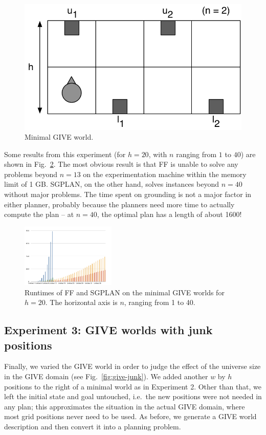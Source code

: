\begin{figure}
  \centering
  \includegraphics[width=0.4 \textwidth]{pic-buttons}
  \caption{Minimal GIVE world.}
  \label{fig:give-minimal}
\end{figure}

Some results from this experiment (for $h=20$, with $n$ ranging from
$1$ to $40$) are shown in Fig.~\ref{fig:give-runtime-minimal}.  The
most obvious result is that FF is unable to solve any problems beyond
$n=13$ on the experimentation machine within the memory limit of 1 GB.
SGPLAN, on the other hand, solves instances beyond $n=40$ without
major problems.  The time spent on grounding is not a major factor in
either planner, probably because the planners need more time to
actually compute the plan -- at $n=40$, the optimal plan has a length
of about 1600!

\begin{figure}
  \centering
  \includegraphics[width=0.4\textwidth]{pic-runtime-buttons}
  \caption{Runtimes of FF and SGPLAN on the minimal GIVE worlds for $h=20$. The horizontal axis is $n$, ranging from 1 to 40.}
  \label{fig:give-runtime-minimal}
\end{figure}

\subsection{Experiment 3: GIVE worlds with junk positions}
\label{sec:experiment-3:-give}

Finally, we varied the GIVE world in order to judge the effect of the
universe size in the GIVE domain (see Fig.~\ref{fig:give-junk}).  We
added another $w$ by $h$ positions to the right of a minimal world as
in Experiment 2.  Other than that, we left the initial state and goal
untouched, i.e.\ the new positions were not needed in any plan; this
approximates the situation in the actual GIVE domain, where most grid
positions never need to be used.  As before, we generate a GIVE world
description and then convert it into a planning problem.

